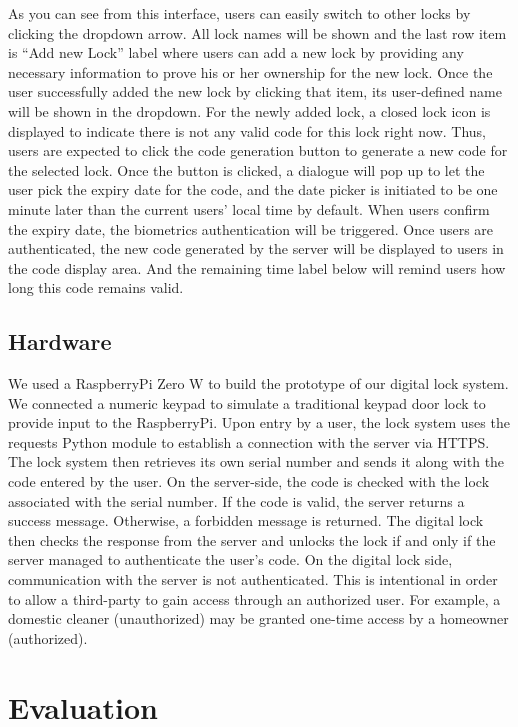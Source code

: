 \documentclass[conference]{IEEEtran}
\begin{document}
As you can see from this interface, users can easily switch to other locks by clicking the dropdown arrow. All lock names will be shown and the last row item is “Add new Lock” label where users can add a new lock by providing any necessary information to prove his or her ownership for the new lock. Once the user successfully added the new lock by clicking that item, its user-defined name will be shown in the dropdown. For the newly added lock, a closed lock icon is displayed to indicate there is not any valid code for this lock right now. Thus, users are expected to click the code generation button to generate a new code for the selected lock. Once the button is clicked, a dialogue will pop up to let the user pick the expiry date for the code, and the date picker is initiated to be one minute later than the current users’ local time by default. When users confirm the expiry date, the biometrics authentication will be triggered. Once users are authenticated, the new code generated by the server will be displayed to users in the code display area. And the remaining time label below will remind users how long this code remains valid. 

\subsection{Hardware}
	We used a RaspberryPi Zero W to build the prototype of our digital lock system. We connected a numeric keypad to simulate a traditional keypad door lock to provide input to the RaspberryPi. Upon entry by a user, the lock system uses the requests Python module to establish a connection with the server via HTTPS. The lock system then retrieves its own serial number and sends it along with the code entered by the user. On the server-side, the code is checked with the lock associated with the serial number. If the code is valid, the server returns a success message. Otherwise, a forbidden message is returned. The digital lock then checks the response from the server and unlocks the lock if and only if the server managed to authenticate the user’s code. On the digital lock side, communication with the server is not authenticated. This is intentional in order to allow a third-party to gain access through an authorized user. For example, a domestic cleaner (unauthorized) may be granted one-time access by a homeowner (authorized).


\section{Evaluation}
\end{document}
